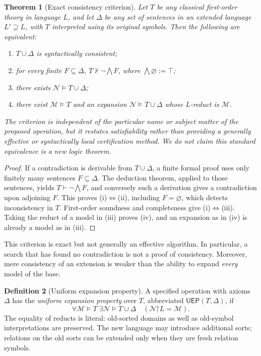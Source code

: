 \documentclass[11pt,letterpaper]{article}
\newtheorem{theorem}{Theorem}[section]
\theoremstyle{definition}
\newtheorem{definition}[theorem]{Definition}
\newcommand{\restr}{\mathord{\upharpoonright}}
\begin{document}
\begin{theorem}[Exact consistency criterion]\label{thm:exact}
Let \(T\) be any classical first-order theory in language \(L\), and let \(\Delta\) be any set of sentences in an extended language \(L'\supseteq L\), with \(T\) interpreted using its original symbols. Then the following are equivalent:
\begin{enumerate}[label=(\roman*)]
\item \(T\cup\Delta\) is syntactically consistent;
\item for every finite \(F\subseteq\Delta\), \(T\not\vdash\neg\bigwedge F\), where \(\bigwedge\varnothing:=\top\);
\item there exists \(\mathcal N\models T\cup\Delta\);
\item there exist \(\mathcal M\models T\) and an expansion \(\mathcal N\models T\cup\Delta\) whose \(L\)-reduct is \(\mathcal M\).
\end{enumerate}
The criterion is independent of the particular name or subject matter of the proposed operation, but it restates satisfiability rather than providing a generally effective or syntactically local certification method. We do not claim this standard equivalence is a new logic theorem.
\end{theorem}
\begin{proof}
If a contradiction is derivable from \(T\cup\Delta\), a finite formal proof uses only finitely many sentences \(F\subseteq\Delta\). The deduction theorem, applied to those sentences, yields \(T\vdash\neg\bigwedge F\), and conversely such a derivation gives a contradiction upon adjoining \(F\). This proves (i)\(\Leftrightarrow\)(ii), including \(F=\varnothing\), which detects inconsistency in \(T\). First-order soundness and completeness give (i)\(\Leftrightarrow\)(iii). Taking the reduct of a model in (iii) proves (iv), and an expansion as in (iv) is already a model as in (iii).
\end{proof}

This criterion is exact but not generally an effective algorithm. In particular, a search that has found no contradiction is not a proof of consistency. Moreover, mere consistency of an extension is weaker than the ability to expand \emph{every} model of the base.

\begin{definition}[Uniform expansion property]\label{def:uep}
A specified operation with axioms \(\Delta\) has the \emph{uniform expansion property} over \(T\), abbreviated \(\mathsf{UEP}(T,\Delta)\), if
\[
\forall\mathcal M\models T\;\exists\mathcal N\models T\cup\Delta
\quad (\mathcal N\restr L=\mathcal M).
\]
The equality of reducts is literal: old-sorted domains as well as old-symbol interpretations are preserved. The new language may introduce additional sorts; relations on the old sorts can be extended only when they are fresh relation symbols.
\end{definition}
\end{document}
